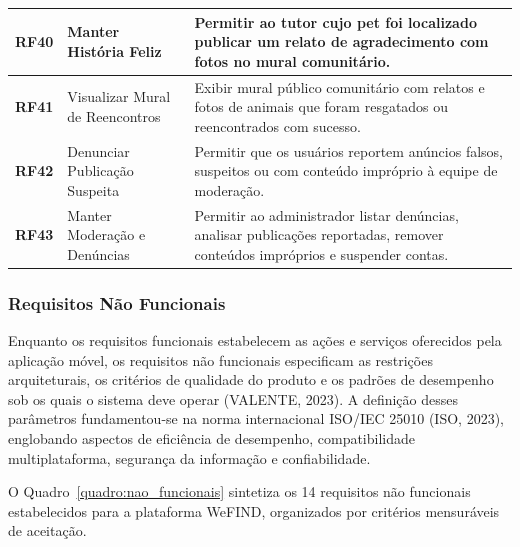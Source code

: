 {\begin{longtable}{|>{\centering\arraybackslash}p{1.3cm}|>{\raggedright\arraybackslash}p{4.2cm}|>{\raggedright\arraybackslash}p{8.8cm}|}
\textbf{RF40} & Manter História Feliz & Permitir ao tutor cujo pet foi localizado publicar um relato de agradecimento com fotos no mural comunitário. \\ \hline
\textbf{RF41} & Visualizar Mural de Reencontros & Exibir mural público comunitário com relatos e fotos de animais que foram resgatados ou reencontrados com sucesso. \\ \hline
\textbf{RF42} & Denunciar Publicação Suspeita & Permitir que os usuários reportem anúncios falsos, suspeitos ou com conteúdo impróprio à equipe de moderação. \\ \hline
\textbf{RF43} & Manter Moderação e Denúncias & Permitir ao administrador listar denúncias, analisar publicações reportadas, remover conteúdos impróprios e suspender contas. \\ \hline
\end{longtable}
}

\clearpage

\subsubsection{Requisitos Não Funcionais}

Enquanto os requisitos funcionais estabelecem as ações e serviços oferecidos pela aplicação móvel, os requisitos não funcionais especificam as restrições arquiteturais, os critérios de qualidade do produto e os padrões de desempenho sob os quais o sistema deve operar (VALENTE, 2023). A definição desses parâmetros fundamentou-se na norma internacional ISO/IEC 25010 (ISO, 2023), englobando aspectos de eficiência de desempenho, compatibilidade multiplataforma, segurança da informação e confiabilidade.

O Quadro~\ref{quadro:nao_funcionais} sintetiza os 14 requisitos não funcionais estabelecidos para a plataforma WeFIND, organizados por critérios mensuráveis de aceitação.

